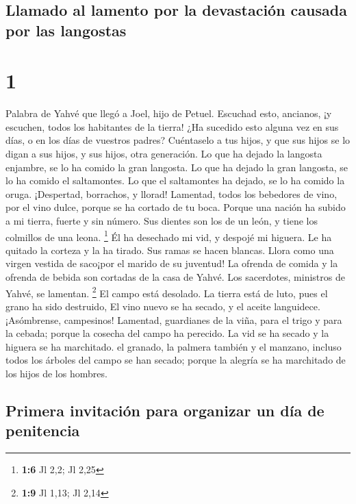 \hypertarget{llamado-al-lamento-por-la-devastaciuxf3n-causada-por-las-langostas}{%
\subsection{Llamado al lamento por la devastación causada por las
langostas}\label{llamado-al-lamento-por-la-devastaciuxf3n-causada-por-las-langostas}}

\hypertarget{section}{%
\section{1}\label{section}}

 Palabra de Yahvé que llegó a Joel, hijo de Petuel.
 Escuchad esto, ancianos, ¡y escuchen, todos los
habitantes de la tierra! ¿Ha sucedido esto alguna vez en sus días, o en
los días de vuestros padres?  Cuéntaselo a tus hijos, y
que sus hijos se lo digan a sus hijos, y sus hijos, otra generación.
 Lo que ha dejado la langosta enjambre, se lo ha comido la
gran langosta. Lo que ha dejado la gran langosta, se lo ha comido el
saltamontes. Lo que el saltamontes ha dejado, se lo ha comido la oruga.
 ¡Despertad, borrachos, y llorad! Lamentad, todos los
bebedores de vino, por el vino dulce, porque se ha cortado de tu boca.
 Porque una nación ha subido a mi tierra, fuerte y sin
número. Sus dientes son los de un león, y tiene los colmillos de una
leona. \footnote{\textbf{1:6} Jl 2,2; Jl 2,25}  Él ha
desechado mi vid, y despojé mi higuera. Le ha quitado la corteza y la ha
tirado. Sus ramas se hacen blancas.  Llora como una virgen
vestida de saco¡por el marido de su juventud!  La ofrenda
de comida y la ofrenda de bebida son cortadas de la casa de Yahvé. Los
sacerdotes, ministros de Yahvé, se lamentan. \footnote{\textbf{1:9} Jl
  1,13; Jl 2,14}  El campo está desolado. La tierra está
de luto, pues el grano ha sido destruido, El vino nuevo se ha secado, y
el aceite languidece.  ¡Asómbrense, campesinos! Lamentad,
guardianes de la viña, para el trigo y para la cebada; porque la cosecha
del campo ha perecido.  La vid se ha secado y la higuera
se ha marchitado. el granado, la palmera también y el manzano, incluso
todos los árboles del campo se han secado; porque la alegría se ha
marchitado de los hijos de los hombres.

\hypertarget{primera-invitaciuxf3n-para-organizar-un-duxeda-de-penitencia}{%
\subsection{Primera invitación para organizar un día de
penitencia}\label{primera-invitaciuxf3n-para-organizar-un-duxeda-de-penitencia}}

